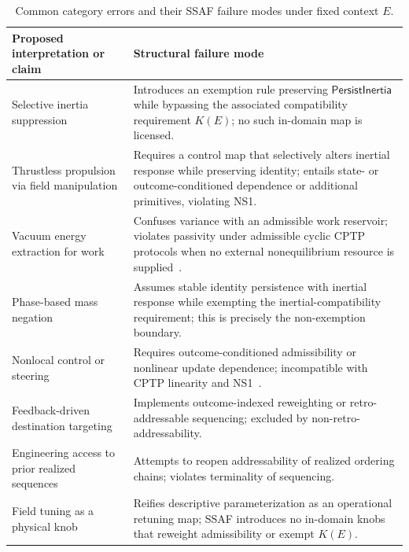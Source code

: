 \documentclass[aps,prx,onecolumn,11pt]{revtex4-2}
\theoremstyle{plain}
\theoremstyle{definition}
\theoremstyle{remark}
\begin{document}
\begin{table}[t]
\centering
\caption{Common category errors and their SSAF failure modes under
fixed context \(E\).}
\label{tab:category_errors_failure_modes}
\begin{tabular}{p{} p{}}
\toprule
\textbf{Proposed interpretation or claim}
&
\textbf{Structural failure mode} \\
\midrule

Selective inertia suppression
&
Introduces an exemption rule preserving
\(\mathsf{PersistInertia}\) while bypassing the associated
compatibility requirement \(K(E)\); no such in-domain map is licensed.
\\[0.35em]

Thrustless propulsion via field manipulation
&
Requires a control map that selectively alters inertial response while
preserving identity; entails state- or outcome-conditioned dependence
or additional primitives, violating NS1.
\\[0.35em]

Vacuum energy extraction for work
&
Confuses variance with an admissible work reservoir; violates
passivity under admissible cyclic CPTP protocols when no external
nonequilibrium resource is supplied~\cite{Pusz1978,Lenard1978}.
\\[0.35em]

Phase-based mass negation
&
Assumes stable identity persistence with inertial response while
exempting the inertial-compatibility requirement; this is precisely the
non-exemption boundary.
\\[0.35em]

Nonlocal control or steering
&
Requires outcome-conditioned admissibility or nonlinear update
dependence; incompatible with CPTP linearity and
NS1~\cite{Gisin1989,Gisin1990}.
\\[0.35em]

Feedback-driven destination targeting
&
Implements outcome-indexed reweighting or retro-addressable sequencing;
excluded by non-retro-addressability.
\\[0.35em]

Engineering access to prior realized sequences
&
Attempts to reopen addressability of realized ordering chains; violates
terminality of sequencing.
\\[0.35em]

Field tuning as a physical knob
&
Reifies descriptive parameterization as an operational retuning map;
SSAF introduces no in-domain knobs that reweight admissibility or
exempt \(K(E)\).
\\
\bottomrule
\end{tabular}
\end{table}
\end{document}
